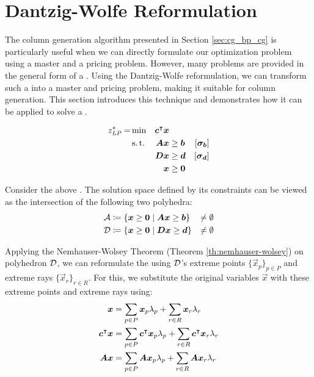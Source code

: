 \section{Dantzig-Wolfe Reformulation}\label{sec:cg_bp_dwr}

The column generation algorithm presented in Section \ref{sec:cg_bp_cg} is particularly useful when we can directly formulate our optimization problem using a master and a pricing problem. However, many problems are provided in the general form of a \LP{}. Using the Dantzig-Wolfe reformulation, we can transform such a \LP{} into a master and pricing problem, making it suitable for column generation. This section introduces this technique and demonstrates how it can be applied to solve a \LP{}.

\begin{equation}
\begin{aligned}
z^*_{\textit{LP}}{} = &\min & {\bm{c}}^\intercal {\bm{x}} & & & \\
&\operatorname{s.t.} & {\bm{A}} {\bm{x}} & \geq {\bm{b}} & \left[{\bm{\sigma}}_{\bm{b}}\right] & \\
&& {\bm{D}} {\bm{x}} & \geq {\bm{d}} & \left[{\bm{\sigma}}_{\bm{d}}\right] & \\
&& {\bm{x}} & \geq {\bm{0}}
\end{aligned}
\end{equation}

Consider the above \LP{}. The solution space defined by its constraints can be viewed as the intersection of the following two polyhedra:
\begin{equation}
\begin{aligned}
\mathcal{A} &\coloneqq \left\{ {\bm{x}} \geq {\bm{0}} \mid {\bm{A}} {\bm{x}} \geq {\bm{b}} \right\} &\neq \emptyset \\
\mathcal{D} &\coloneqq \left\{ {\bm{x}} \geq {\bm{0}} \mid {\bm{D}} {\bm{x}} \geq {\bm{d}} \right\} &\neq \emptyset
\end{aligned}
\end{equation}

Applying the Nemhauser-Wolsey Theorem (Theorem \ref{th:nemhauser-wolsey}) on polyhedron $\mathcal{D}$, we can reformulate the \LP{} using $\mathcal{D}$'s extreme points $\{\vec{x}_p\}_{p \in P}$ and extreme rays $\{\vec{x}_r\}_{r \in R}$. For this, we substitute the original variables $\vec{x}$ with these extreme points and extreme rays using:
\begin{equation}
\begin{aligned}
{\bm{x}} &= \sum_{p \in P} {\bm{x}}_p \lambda_p + \sum_{r \in R} {\bm{x}}_r \lambda_r \\
{\bm{c}}^\intercal {\bm{x}} &= \sum_{p \in P} {\bm{c}}^\intercal {\bm{x}}_p \lambda_p + \sum_{r \in R} {\bm{c}}^\intercal {\bm{x}}_r \lambda_r \\
{\bm{A}} {\bm{x}} &= \sum_{p \in P} {\bm{A}} {\bm{x}}_p \lambda_p + \sum_{r \in R} {\bm{A}} {\bm{x}}_r \lambda_r
\end{aligned}
\end{equation}

